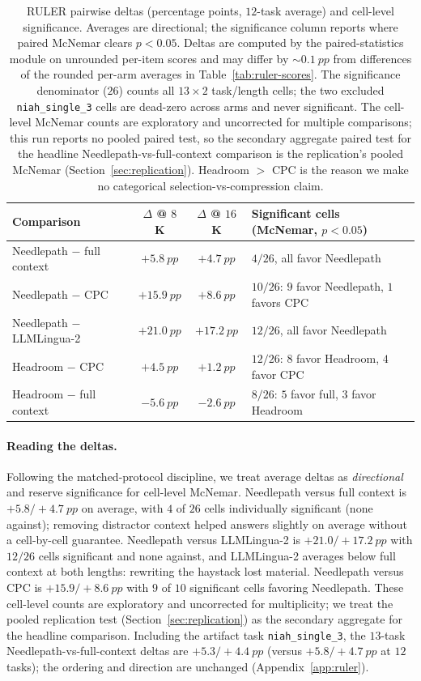 \documentclass[11pt]{article}
\newcommand{\pp}{~pp}          %
\newcommand{\NP}{Needlepath}
\begin{document}
\begin{table}[t]
\centering
\small
\begin{tabular}{@{}lccl@{}}
\toprule
Comparison & $\Delta$ @ $8$K & $\Delta$ @ $16$K & Significant cells (McNemar, $p<0.05$) \\
\midrule
\NP{} $-$ full context     & $+5.8\pp$  & $+4.7\pp$  & $4/26$, all favor \NP{} \\
\NP{} $-$ CPC              & $+15.9\pp$ & $+8.6\pp$  & $10/26$: $9$ favor \NP{}, $1$ favors CPC \\
\NP{} $-$ LLMLingua-2      & $+21.0\pp$ & $+17.2\pp$ & $12/26$, all favor \NP{} \\
Headroom $-$ CPC           & $+4.5\pp$  & $+1.2\pp$  & $12/26$: $8$ favor Headroom, $4$ favor CPC \\
Headroom $-$ full context  & $-5.6\pp$  & $-2.6\pp$  & $8/26$: $5$ favor full, $3$ favor Headroom \\
\bottomrule
\end{tabular}
\caption{RULER pairwise deltas (percentage points, $12$-task average) and cell-level significance.
Averages are directional; the significance column reports where paired McNemar clears $p<0.05$.
Deltas are computed by the paired-statistics module on unrounded per-item scores and may differ by
${\sim}0.1\pp$ from differences of the rounded per-arm averages in Table~\ref{tab:ruler-scores}. The
significance denominator ($26$) counts all $13\times2$ task/length cells; the two excluded
\texttt{niah\_single\_3} cells are dead-zero across arms and never significant. The cell-level
McNemar counts are exploratory and uncorrected for multiple comparisons; this run reports no
pooled paired test, so the secondary aggregate paired test for the headline
\NP{}-vs-full-context comparison is the replication's pooled McNemar
(Section~\ref{sec:replication}). Headroom $>$ CPC is the reason we make no categorical
selection-vs-compression claim.}
\label{tab:ruler-pairwise}
\end{table}

\paragraph{Reading the deltas.} Following the matched-protocol discipline, we treat average deltas
as \emph{directional} and reserve significance for cell-level McNemar. \NP{} versus full context
is $+5.8/+4.7\pp$ on average, with $4$ of $26$ cells individually significant (none against);
removing distractor context helped answers slightly on average without a cell-by-cell guarantee.
\NP{} versus LLMLingua-2 is $+21.0/+17.2\pp$ with $12/26$ cells significant and none against, and
LLMLingua-2 averages below full context at both lengths: rewriting the haystack lost material.
\NP{} versus CPC is $+15.9/+8.6\pp$ with $9$ of $10$ significant cells favoring \NP{}. These
cell-level counts are exploratory and uncorrected for multiplicity; we treat the pooled
replication test (Section~\ref{sec:replication}) as the secondary aggregate for the headline
comparison. Including the artifact task \texttt{niah\_single\_3}, the $13$-task
\NP{}-vs-full-context deltas are $+5.3/+4.4\pp$ (versus $+5.8/+4.7\pp$ at $12$ tasks); the ordering
and direction are unchanged (Appendix~\ref{app:ruler}).
\end{document}

